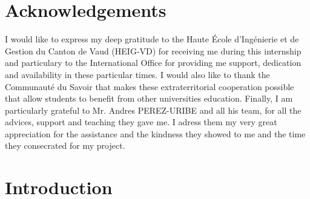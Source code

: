\documentclass[12pt, a4paper]{report}
\begin{document}
	\makeutbmfrontcover{}

	\tableofcontents{}
	
	\listoffigures
	
	\printglossary
	
	\setlength{\parindent}{15pt}
	
	\chapter*{Acknowledgements}
	I would like to express my deep gratitude to the Haute École d'Ingénierie et de Gestion du Canton de Vaud (HEIG-VD) for receiving me during this internship and particulary to the International Office for providing me support, dedication and availability in these particular times.
	I would also like to thank the Communauté du Savoir that makes these extraterritorial cooperation possible that allow students to benefit from other universities education.
	Finally, I am particularly grateful to Mr. Andres PEREZ-URIBE and all his team, for all the advices, support and teaching they gave me.
	I adress them my very great appreciation for the assistance and the kindness they showed to me and the time they consecrated for my project.
	\chapter{Introduction}
\end{document}

